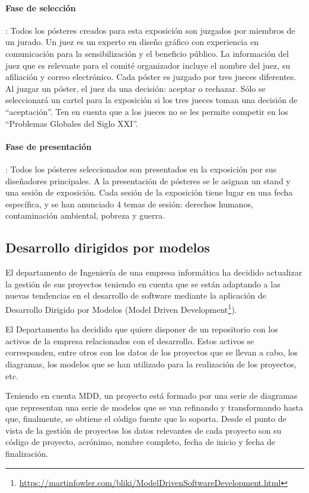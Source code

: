 \documentclass{db-practice}
\begin{document}
\paragraph{Fase de selección}: Todos los pósteres creados para esta exposición son juzgados por miembros de un jurado.  Un juez es un experto en diseño gráfico con experiencia en comunicación para la sensibilización y el beneficio público.  La información del juez que es relevante para el comité organizador incluye el nombre del juez, su afiliación y correo electrónico.  Cada póster es juzgado por tres jueces diferentes.  Al juzgar un póster, el juez da una decisión: aceptar o rechazar.  Sólo se seleccionará un cartel para la exposición si los tres jueces toman una decisión de ``aceptación''.  Ten en cuenta que a los jueces no se les permite competir en los ``Problemas Globales del Siglo XXI''.
\paragraph{Fase de presentación}: Todos los pósteres seleccionados son presentados en la exposición por sus diseñadores principales.  A la presentación de pósteres se le asignan un stand y una sesión de exposición.  Cada sesión de la exposición tiene lugar en una fecha específica, y se han anunciado 4 temas de sesión: derechos humanos, contaminación ambiental, pobreza y guerra.

\subsection{Desarrollo dirigidos por modelos}

El departamento de Ingeniería de una empresa informática ha decidido actualizar la gestión de sus proyectos teniendo en cuenta que se están adaptando a las nuevas tendencias en el desarrollo de software mediante la aplicación de Desarrollo Dirigido por Modelos (Model Driven Development\footnote{\url{https://martinfowler.com/bliki/ModelDrivenSoftwareDevelopment.html}}).

El Departamento ha decidido que quiere disponer de un repositorio con los activos de la empresa relacionados con el desarrollo. Estos activos se corresponden, entre otros con los datos de los proyectos que se llevan a cabo, los diagramas, los modelos que se han utilizado para la realización de los proyectos, etc.

Teniendo en cuenta MDD, un proyecto está formado por una serie de diagramas que representan una serie de modelos que se van refinando y transformando hasta que, finalmente, se obtiene el código fuente que lo soporta. Desde el punto de vista de la gestión de proyectos los datos relevantes de cada proyecto son su código de proyecto, acrónimo, nombre completo, fecha de inicio y fecha de finalización.
\end{document}
